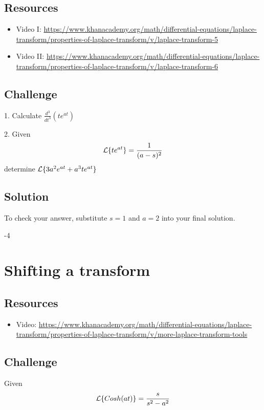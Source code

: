 \subsection*{Resources}
\begin{itemize} %
    \item Video I: \url{https://www.khanacademy.org/math/differential-equations/laplace-transform/properties-of-laplace-transform/v/laplace-transform-5} %
    \item Video II: \url{https://www.khanacademy.org/math/differential-equations/laplace-transform/properties-of-laplace-transform/v/laplace-transform-6} %
\end{itemize}

\subsection*{Challenge}
1. Calculate $\displaystyle \frac{d^3}{dt^3} \left( t e^{a t} \right)$

2. Given
\begin{equation}
    \mathcal{L}\{t e^{a t}\} = \frac{1}{(a-s)^2}
\end{equation}
determine $\mathcal{L}\{3a^2 e^{at} + a^3te^{at}\}$

\subsection*{Solution}
To check your answer, substitute $s=1$ and $a=2$ into your final solution.

-4




\newpage
\section{Shifting a transform}

\subsection*{Resources}
\begin{itemize}
    \item Video: \url{https://www.khanacademy.org/math/differential-equations/laplace-transform/properties-of-laplace-transform/v/more-laplace-transform-tools} %
\end{itemize}

\subsection*{Challenge}
Given
\begin{equation}
    \mathcal{L}\{Cosh(at)\} = \frac{s}{s^2-a^2}
\end{equation}

